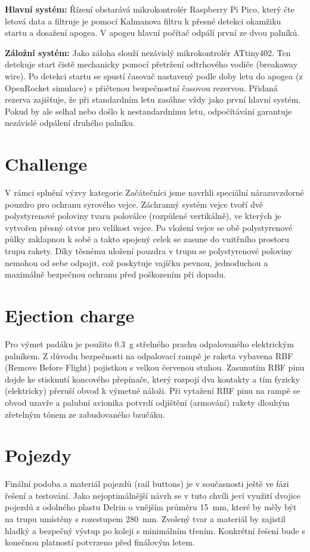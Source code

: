 \documentclass[a4paper,12pt]{article}
\begin{document}
\textbf{Hlavní systém:}
Řízení obstarává mikrokontrolér Raspberry Pi Pico, který čte letová data a filtruje je pomocí Kalmanova filtru k přesné detekci okamžiku startu a dosažení apogea. V apogeu hlavní počítač odpálí první ze dvou palníků.

\textbf{Záložní systém:}
Jako záloha slouží nezávislý mikrokontrolér ATtiny402. Ten detekuje start čistě mechanicky pomocí přetržení odtrhového vodiče (breakaway wire). Po detekci startu se spustí časovač nastavený podle doby letu do apogea (z OpenRocket simulace) s přičtenou bezpečnostní časovou rezervou. Přidaná rezerva zajišťuje, že při standardním letu zasáhne vždy jako první hlavní systém. Pokud by ale selhal nebo došlo k nestandardnímu letu, odpočítávání garantuje nezávislé odpálení druhého palníku.

\section{Challenge}
V rámci splnění výzvy kategorie Začátečníci jsme navrhli speciální nárazuvzdorné pouzdro pro ochranu syrového vejce. Záchranný systém vejce tvoří dvě polystyrenové poloviny tvaru poloválce (rozpůlené vertikálně), ve kterých je vytvořen přesný otvor pro velikost vejce. 
Po vložení vejce se obě polystyrenové půlky zaklapnou k sobě a takto spojený celek se zasune do vnitřního prostoru trupu rakety. Díky těsnému uložení pouzdra v trupu se polystyrenové poloviny nemohou od sebe odpojit, což poskytuje vajíčku pevnou, jednoduchou a maximálně bezpečnou ochranu před poškozením při dopadu.

\section{Ejection charge}
Pro výmet padáku je použito 0.3~g střelného prachu odpalovaného elektrickým palníkem.
Z důvodu bezpečnosti na odpalovací rampě je raketa vybavena RBF (Remove Before Flight) pojistkou s velkou červenou stuhou. Zasunutím RBF pinu dojde ke stisknutí koncového přepínače, který rozpojí dva kontakty a tím fyzicky (elektricky) přeruší obvod k výmetné náloži. Při vytažení RBF pinu na rampě se obvod uzavře a palubní avionika potvrdí odjištění (armování) rakety dlouhým zřetelným tónem ze zabudovaného bzučáku.

\section{Pojezdy}
Finální podoba a materiál pojezdů (rail buttons) je v současnosti ještě ve fázi řešení a testování. Jako nejoptimálnější návrh se v tuto chvíli jeví využití dvojice pojezdů z odolného plastu Delrin o vnějším průměru 15~mm, které by měly být na trupu umístěny s rozestupem 280~mm. Zvolený tvar a materiál by zajistil hladký a bezpečný výstup po koleji s minimálním třením. Konkrétní řešení bude s konečnou platností potvrzeno před finálovým letem.
\end{document}
